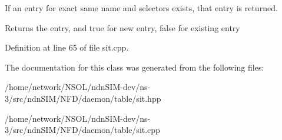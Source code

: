 If an entry for exact same name and selectors exists, that entry is returned. \begin{DoxyReturn}{Returns}
the entry, and true for new entry, false for existing entry 
\end{DoxyReturn}


Definition at line 65 of file sit.\+cpp.



The documentation for this class was generated from the following files\+:\begin{DoxyCompactItemize}
\item 
/home/network/\+N\+S\+O\+L/ndn\+S\+I\+M-\/dev/ns-\/3/src/ndn\+S\+I\+M/\+N\+F\+D/daemon/table/sit.\+hpp\item 
/home/network/\+N\+S\+O\+L/ndn\+S\+I\+M-\/dev/ns-\/3/src/ndn\+S\+I\+M/\+N\+F\+D/daemon/table/sit.\+cpp\end{DoxyCompactItemize}
